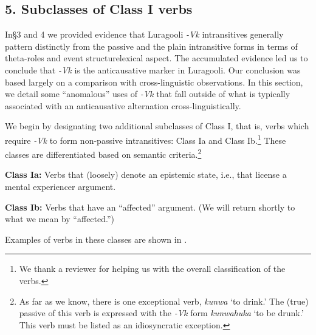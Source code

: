 \documentclass[output=paper]{langsci/langscibook}
\begin{document}
\begin{styleTabellenberschrift}
\chapter[5. Subclasses of Class I verbs]{5. Subclasses of Class I verbs}

In§3 and 4 we provided evidence that Luragooli \textit{{}-Vk} intransitives generally pattern distinctly from the passive and the plain intransitive forms in terms of theta-roles and event structurelexical aspect. The accumulated evidence led us to conclude that \textit{{}-Vk} is the anticausative marker in Luragooli. Our conclusion was based largely on a comparison with cross-linguistic observations. In this section, we detail some “anomalous” uses of \textit{{}-Vk} that fall outside of what is typically associated with an anticausative alternation cross-linguistically.

We begin by designating two additional subclasses of Class I, that is, verbs which require \textit{{}-Vk} to form non-passive intransitives: Class Ia and Class Ib.\footnote{We thank a reviewer for helping us with the overall classification of the verbs.} These classes are differentiated based on semantic criteria.\footnote{ As far as we know, there is one exceptional verb, \textit{kunwa} ‘to drink.’ The (true) passive of this verb is expressed with the \textit{{}-Vk }form \textit{kunwahuka }‘to be drunk.’ This verb must be listed as an idiosyncratic exception. }

\textbf{Class Ia:} Verbs that (loosely) denote an epistemic state, i.e., that license a mental experiencer argument.

\textbf{Class Ib:} Verbs that have an “affected” argument. (We will return shortly to what we mean by “affected.”)

Examples of verbs in these classes are shown in .

\begin{styleTabellenberschrift}%
\begin{table}
\caption{Transitivity alternations outside of the expected set of anticausative verbs%
\label{tab:4}
\end{table}%


\end{styleTabellenberschrift}
\end{styleTabellenberschrift}
\end{document}
